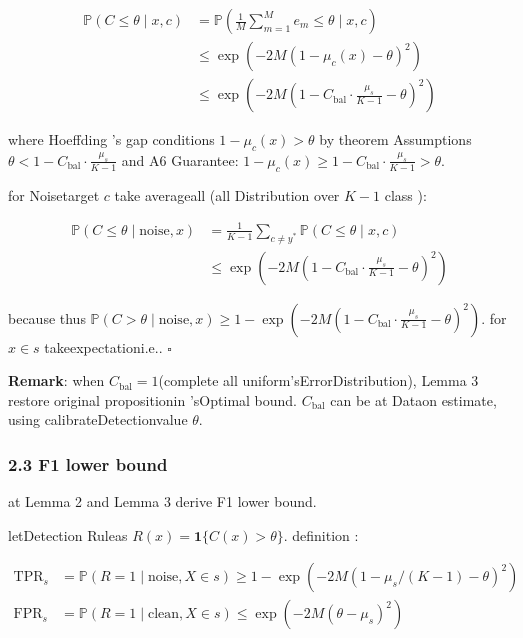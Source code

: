 \documentclass[
  12pt,
]{article}
\begin{document}
\[\begin{aligned}
\mathbb{P}(C \leq \theta \mid x, c)
&= \mathbb{P}\!\left(\frac{1}{M} \sum_{m=1}^M e_m \leq \theta \;\Big|\; x, c\right) \\
&\leq \exp\!\left(-2M\left(1 - \mu_c(x) - \theta\right)^2\right) \\
&\leq \exp\!\left(-2M\left(1 - C_{\text{bal}} \cdot \frac{\mu_s}{K-1} - \theta\right)^2\right)
\end{aligned}\]

where Hoeffding 's gap conditions \(1 - \mu_c(x) > \theta\) by theorem Assumptions
\(\theta < 1 - C_{\text{bal}} \cdot \frac{\mu_s}{K-1}\) and  A6 Guarantee: 
\(1 - \mu_c(x) \geq 1 - C_{\text{bal}} \cdot \frac{\mu_s}{K-1} > \theta\). 

for Noisetarget  \(c\) take averageall (all Distribution over \(K-1\) class ):

\[\begin{aligned}
\mathbb{P}(C \leq \theta \mid \text{noise}, x)
&= \frac{1}{K-1} \sum_{c \neq y^*} \mathbb{P}(C \leq \theta \mid x, c) \\
&\leq \exp\!\left(-2M\left(1 - C_{\text{bal}} \cdot \frac{\mu_s}{K-1} - \theta\right)^2\right)
\end{aligned}\]

because thus
\(\mathbb{P}(C > \theta \mid \text{noise}, x) \geq 1 - \exp(-2M(1 - C_{\text{bal}} \cdot \frac{\mu_s}{K-1} - \theta)^2)\). for 
\(x \in s\) takeexpectationi.e.. \(\square\)

\textbf{Remark}: when  \(C_{\text{bal}} = 1\)(complete all uniform'sErrorDistribution), Lemma
3 restore original propositionin 'sOptimal bound. \(C_{\text{bal}}\)
can be at Dataon estimate, using calibrateDetectionvalue  \(\theta\). 

\subsubsection{2.3 F1 lower bound}\label{f1-ux4e0bux754c}

at  Lemma 2 and  Lemma 3 derive F1 lower bound. 

letDetection Ruleas  \(R(x) = \mathbf{1}\{C(x) > \theta\}\). definition : 

\[\begin{aligned}
\text{TPR}_s &= \mathbb{P}(R = 1 \mid \text{noise}, X \in s) \geq 1 - \exp(-2M(1 - \mu_s/(K-1) - \theta)^2) \\
\text{FPR}_s &= \mathbb{P}(R = 1 \mid \text{clean}, X \in s) \leq \exp(-2M(\theta - \mu_s)^2)
\end{aligned}\]
\end{document}
